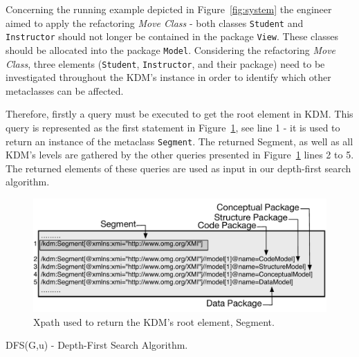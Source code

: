 Concerning the running example depicted in Figure~\ref{fig:system} the engineer aimed to apply the refactoring \textit{Move Class} - both classes \texttt{Student} and \texttt{Instructor} should not longer be contained in the package \texttt{View}. These classes should be allocated into the package \texttt{Model}. Considering the refactoring \textit{Move Class}, three elements (\texttt{Student}, \texttt{Instructor}, and their package) need to be investigated throughout the KDM's instance in order to identify which other metaclasses can be affected. 

Therefore, firstly a query must be executed to get the root element in KDM. This query is represented as the first statement in Figure~\ref{fig:queriesXPath}, see line 1 - it is used to return an instance of the metaclass \texttt{Segment}. The returned Segment, as well as all KDM's levels are gathered by the other queries presented in Figure~\ref{fig:queriesXPath} lines 2 to 5. The returned elements of these queries are used as input in our depth-first search algorithm.

\begin{figure}[h]
	\centering
	\includegraphics[scale=0.479]{figuras/queiresANDATLSBESNew}
	\caption{Xpath used to return the KDM's root element, Segment.}
	\label{fig:queriesXPath}
\end{figure}


\begin{algorithm}[h]
     \SetAlgoLined
     \caption{DFS(G,u) - Depth-First Search Algorithm.}
     \label{alg:death1}
   \end{algorithm}

